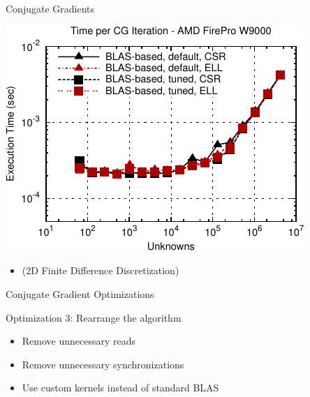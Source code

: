 \begin{frame}[fragile]{Conjugate Gradients}
 \begin{block}{}
 \begin{center}
  \vspace*{-0.5cm}
  \includegraphics[width=0.85\textwidth]{figures/cg-firepro-w9000-2}
 \end{center}

 \begin{itemize}
  \item   \vspace*{-0.3cm} {\small (2D Finite Difference Discretization)}
 \end{itemize}
 \end{block}   
\end{frame}



\begin{frame}[fragile]{Conjugate Gradient Optimizations}

 \begin{block}{Optimization 3: Rearrange the algorithm}
   \begin{itemize}
   \item  Remove unnecessary reads 
   \item  Remove unnecessary synchronizations
   \item Use custom kernels instead of standard BLAS
  \end{itemize}
 \end{block}
   
\end{frame}


